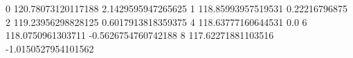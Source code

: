 0 120.78073120117188 2.1429595947265625
1 118.85993957519531 0.22216796875
2 119.23956298828125 0.6017913818359375
4 118.63777160644531 0.0
6 118.0750961303711 -0.5626754760742188
8 117.62271881103516 -1.0150527954101562
